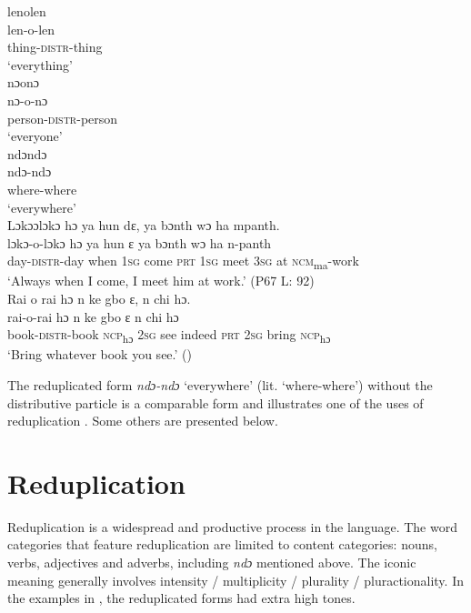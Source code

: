 \TabPositions{2cm,4cm,6cm,8cm}

\ea%
    \label{ex:190} \ea lenolen\\
    \gll len-o-len\\
    thing-\textsc{distr}{}-thing\\
    \glt ‘everything'\\
    \vspace{6pt}
   \ex nɔonɔ\\   
    \gll nɔ-o-nɔ\\
    person-\textsc{distr}{}-person\\
    \glt ‘everyone'\\
    \vspace{6pt}
    \ex\label{ex:190c} ndɔndɔ\\
    \gll ndɔ-ndɔ\\
    where-where\\
    \glt ‘everywhere'\\
        \vspace{6pt}
    \ex Lɔkɔɔlɔkɔ hɔ ya hun dɛ, ya bɔnth wɔ ha mpanth.\\
    \gll lɔkɔ-o-lɔkɔ    hɔ    ya     hun     ɛ    ya    bɔnth    wɔ    ha    n-panth\\
    day-\textsc{distr}{}-day  when  \textsc{1sg}  come    \textsc{prt}  \textsc{1sg}  meet    \textsc{3sg}  at    \textsc{ncm}\textsubscript{ma}{}-work\\
    \glt ‘Always when I come, I meet him at work.' (P67 L: 92)\\
        \vspace{6pt}
    \ex Rai o rai hɔ n ke gbo ɛ, n chi hɔ.\\
    \gll rai-o-rai        hɔ      n    ke    gbo    ɛ    n    chi    hɔ\\
    book-\textsc{distr}{}-book  \textsc{ncp}\textsubscript{hɔ}    \textsc{2sg}  see  indeed  \textsc{prt}  \textsc{2sg}  bring    \textsc{ncp}\textsubscript{hɔ}\\
    \glt ‘Bring whatever book you see.' (\citealt[34]{Sumner1921})
\z
\z

The reduplicated form \textit{ndɔ-ndɔ} ‘everywhere' (lit. ‘where-where') without the distributive particle is a comparable form and illustrates one of the uses of reduplication . Some others are presented below.

\section{Reduplication}
\label{sec:7.5}
Reduplication is a widespread and productive process in the language. The word categories that feature reduplication are limited to content categories: nouns, verbs, adjectives and adverbs, including \textit{ndɔ} mentioned above. The iconic meaning generally involves intensity / multiplicity / plurality / pluractionality. In the examples in , the reduplicated forms had extra high tones.

